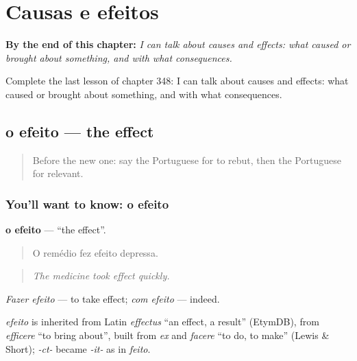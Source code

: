 
\chapter{Causas e efeitos}
\label{ch:pt-causas-e-efeitos}

\begin{chapteropening}
\textbf{By the end of this chapter:} \emph{I can talk about causes and effects: what caused or brought about something, and with what consequences.}

Complete the last lesson of chapter 348: I can talk about causes and effects: what caused or brought about something, and with what consequences.
\end{chapteropening}

\section[o efeito]{o efeito — the effect}

\label{lesson:PT-C348-efeito}



\begin{quote}
Before the new one: say the Portuguese for to rebut, then the Portuguese for relevant.
\end{quote}

\subsection*{You'll want to know: o efeito}
\textbf{o efeito} — \textquotedblleft{}the effect\textquotedblright{}.

\begin{quote}
O remédio fez efeito depressa.
\end{quote}

\begin{quote}
\emph{The medicine took effect quickly.}
\end{quote}

\emph{Fazer efeito} — to take effect; \emph{com efeito} — indeed.

\begin{cousinweb}
\emph{efeito} is inherited from Latin \emph{effectus} \textquotedblleft{}an effect, a result\textquotedblright{} (EtymDB), from \emph{efficere} \textquotedblleft{}to bring about\textquotedblright{}, built from \emph{ex} and \emph{facere} \textquotedblleft{}to do, to make\textquotedblright{} (Lewis \& Short); \emph{-ct-} became \emph{-it-} as in \emph{feito}.
\end{cousinweb}

